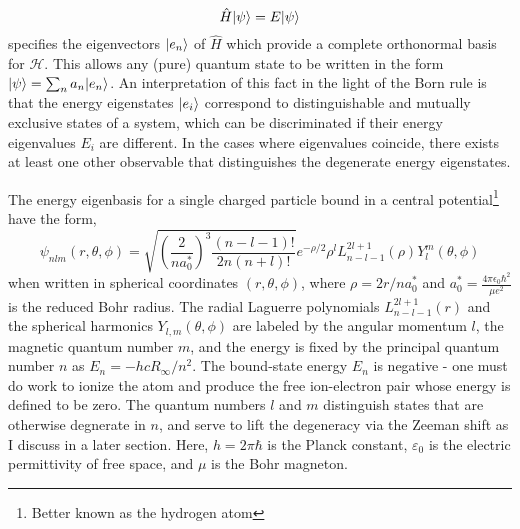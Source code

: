 	\begin{equation}
		\hat{H}|\psi\rangle = E|\psi\rangle
		\label{eqn:TISE}
	\end{equation}
	specifies the eigenvectors $|e_n\rangle$ of $\hat{H}$ which provide a complete orthonormal basis for $\mathcal{H}$. This allows any (pure) quantum state to be written in the form $|\psi\rangle = \sum_n a_n|e_n\rangle$. An interpretation of this fact in the light of the Born rule is that the energy eigenstates $|e_i\rangle$ correspond to distinguishable  and mutually exclusive  states of a system, which can be discriminated if their energy eigenvalues $E_i$ are different. In the cases where eigenvalues coincide, there exists at least one other observable that distinguishes the degenerate energy eigenstates.
	
	
	The energy eigenbasis for a single charged particle bound in a central potential\footnote{Better known as the hydrogen atom} have the form,
	\begin{equation}
	\psi_{nlm}(r,\theta,\phi) = 
	\sqrt{\left(\frac{2}{na_0 ^*}\right)^3\frac{(n-l-1)!}{2n(n+l)!}}e^{-\rho/2}\rho^l L_{n-l-1}^{2l+1}(\rho) Y^{m}_{l}(\theta,\phi)
	\end{equation}
	when written in spherical coordinates $(r,\theta,\phi)$, where $\rho = 2r/na_0 ^*$ and $a_0 ^* = \frac{4\pi\epsilon_0 \hbar^2}{\mu e^2}$ is the reduced Bohr radius.
	The radial Laguerre polynomials $L_{n-l-1}^{2l+1}(r)$ and the spherical harmonics $Y_{l,m}(\theta,\phi)$ are labeled by the angular momentum $l$, the magnetic quantum number $m$, and the energy is fixed by the principal quantum number $n$ as $E_n = -hcR_\infty/n^2$. The bound-state energy $E_n$ is negative - one must do work to ionize the atom and produce the free ion-electron pair whose energy is defined to be zero. The quantum numbers $l$ and $m$ distinguish states that are otherwise degnerate in $n$, and serve to lift the degeneracy via the Zeeman shift as I discuss in a later section. Here,  $h=2\pi\hbar$ is the Planck constant, $\varepsilon_0$ is the electric permittivity of free space, and $\mu$ is the Bohr magneton.
	
	

